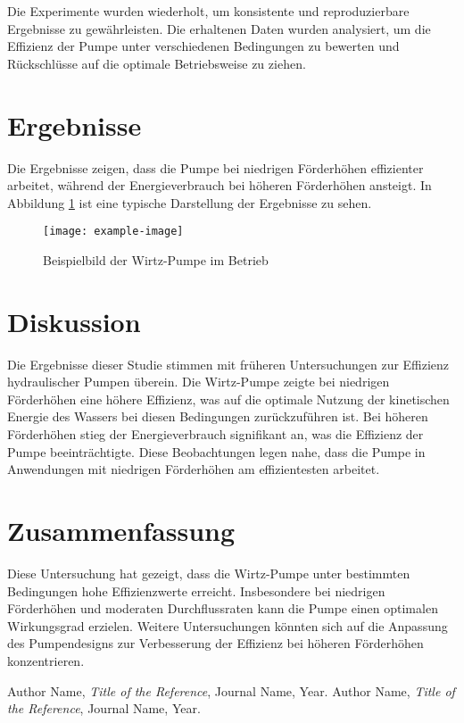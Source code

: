 \documentclass[12pt]{article}
\begin{document}
Die Experimente wurden wiederholt, um konsistente und reproduzierbare Ergebnisse zu gewährleisten. Die erhaltenen Daten wurden analysiert, um die Effizienz der Pumpe unter verschiedenen Bedingungen zu bewerten und Rückschlüsse auf die optimale Betriebsweise zu ziehen.

\section{Ergebnisse}
Die Ergebnisse zeigen, dass die Pumpe bei niedrigen Förderhöhen effizienter arbeitet, während der Energieverbrauch bei höheren Förderhöhen ansteigt. In Abbildung \ref{fig:example} ist eine typische Darstellung der Ergebnisse zu sehen.

\begin{figure}[h]
    \centering
    \texttt{[image: example-image]} %
    \caption{Beispielbild der Wirtz-Pumpe im Betrieb}
    \label{fig:example}
\end{figure}

\section{Diskussion}
Die Ergebnisse dieser Studie stimmen mit früheren Untersuchungen zur Effizienz hydraulischer Pumpen überein. Die Wirtz-Pumpe zeigte bei niedrigen Förderhöhen eine höhere Effizienz, was auf die optimale Nutzung der kinetischen Energie des Wassers bei diesen Bedingungen zurückzuführen ist. Bei höheren Förderhöhen stieg der Energieverbrauch signifikant an, was die Effizienz der Pumpe beeinträchtigte. Diese Beobachtungen legen nahe, dass die Pumpe in Anwendungen mit niedrigen Förderhöhen am effizientesten arbeitet.

\section{Zusammenfassung}
Diese Untersuchung hat gezeigt, dass die Wirtz-Pumpe unter bestimmten Bedingungen hohe Effizienzwerte erreicht. Insbesondere bei niedrigen Förderhöhen und moderaten Durchflussraten kann die Pumpe einen optimalen Wirkungsgrad erzielen. Weitere Untersuchungen könnten sich auf die Anpassung des Pumpendesigns zur Verbesserung der Effizienz bei höheren Förderhöhen konzentrieren.

\begin{thebibliography}{9}
 Author Name, \textit{Title of the Reference}, Journal Name, Year.
 Author Name, \textit{Title of the Reference}, Journal Name, Year.
\end{thebibliography}
\end{document}
